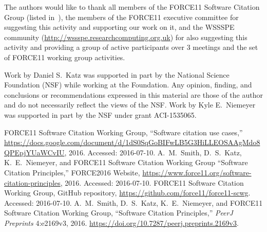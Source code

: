 \documentclass[conference]{IEEEtran}
\begin{document}
The authors would like to thank all members of the FORCE11 Software Citation Group (listed in~\cite{bib3}), the members of the FORCE11 executive committee for suggesting this activity and supporting our work on it, and the WSSSPE community (\url{http://wssspe.researchcomputing.org.uk}) for also suggesting this activity and providing a group of active participants over 3 meetings and the set of FORCE11 working group activities.

Work by Daniel S.~Katz was supported in part by the National Science Foundation (NSF) while working at the Foundation.
Any opinion, finding, and conclusions or recommendations expressed in this material are those of the author and do not necessarily reflect the views of the NSF.
Work by Kyle E.~Niemeyer was supported in part by the NSF under grant ACI-1535065.







%
%
%
\begin{thebibliography}{1}

FORCE11 Software Citation Working Group, ``Software citation use cases,'' \url{https://docs.google.com/document/d/1dS0SqGoBIFwLB5G3HiLLEOSAAgMdo8QPEpjYUaWCvIU}, 2016. Accessed: 2016-07-10.
A.~M.~Smith, D.~S.~Katz, K.~E.~Niemeyer, and FORCE11 Software Citation Working Group ``Software Citation Principles,'' FORCE2016 Website, \url{https://www.force11.org/software-citation-principles}, 2016. Accessed: 2016-07-10.
FORCE11 Software Citation Working Group, GitHub repository, \url{https://github.com/force11/force11-scwg}.  Accessed: 2016-07-10.
A.~M.~Smith, D.~S.~Katz, K.~E.~Niemeyer, and FORCE11 Software Citation Working Group, ``Software Citation Principles,'' \textit{PeerJ Preprints} 4:e2169v3, 2016. \url{https://doi.org/10.7287/peerj.preprints.2169v3}.


\end{thebibliography}




\end{document}

